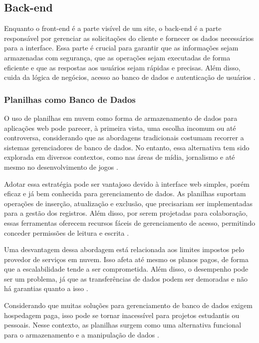 \subsection{Back-end}

Enquanto o front-end é a parte visível de um site, o back-end é a parte responsável por gerenciar as solicitações do cliente e fornecer os dados necessários para a interface. Essa parte é crucial para garantir que as informações sejam armazenadas com segurança, que as operações sejam executadas de forma eficiente e que as respostas aos usuários sejam rápidas e precisas. Além disso, cuida da lógica de negócios, acesso ao banco de dados e autenticação de usuários \cite{garcia2024plataforma}.

\subsubsection{Planilhas como Banco de Dados}

O uso de planilhas em nuvem como forma de armazenamento de dados para aplicações web pode parecer, à primeira vista, uma escolha incomum ou até controversa, considerando que as abordagens tradicionais costumam recorrer a sistemas gerenciadores de banco de dados. No entanto, essa alternativa tem sido explorada em diversos contextos, como nas áreas de mídia, jornalismo e até mesmo no desenvolvimento de jogos \cite{schwertnercharao:hal-02119998}.

Adotar essa estratégia pode ser vantajoso devido à interface web simples, porém eficaz e já bem conhecida para gerenciamento de dados. As planilhas suportam operações de inserção, atualização e exclusão, que precisariam ser implementadas para a gestão dos registros. Além disso, por serem projetadas para colaboração, essas ferramentas oferecem recursos fáceis de gerenciamento de acesso, permitindo conceder permissões de leitura e escrita \cite{schwertnercharao:hal-02119998}.

Uma desvantagem dessa abordagem está relacionada aos limites impostos pelo provedor de serviços em nuvem. Isso afeta até mesmo os planos pagos, de forma que a escalabilidade tende a ser comprometida. Além disso, o desempenho pode ser um problema, já que as transferências de dados podem ser demoradas e não há garantias quanto a isso \cite{schwertnercharao:hal-02119998}.

Considerando que muitas soluções para gerenciamento de banco de dados exigem hospedagem paga, isso pode se tornar inacessível para projetos estudantis ou pessoais. Nesse contexto, as planilhas surgem como uma alternativa funcional para o armazenamento e a manipulação de dados \cite{ufsm2024}.

